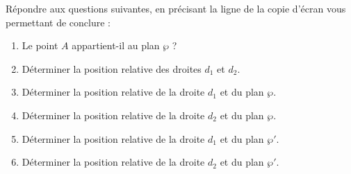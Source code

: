 \begin{TP}




Répondre aux questions suivantes, en
précisant la ligne de la copie d'écran vous permettant de conclure :
\begin{enumerate}
\item Le point $A$ appartient-il au plan $\wp$ ?
\item Déterminer la position relative des droites $d_1$ et $d_2$.
\item Déterminer la position relative de la droite $d_1$ et du plan
  $\wp$.
\item Déterminer la position relative de la droite $d_2$ et du plan
  $\wp$.
\item Déterminer la position relative de la droite $d_1$ et du plan
  $\wp'$.
\item Déterminer la position relative de la droite $d_2$ et du plan
  $\wp'$.
\end{enumerate}
\end{TP}

